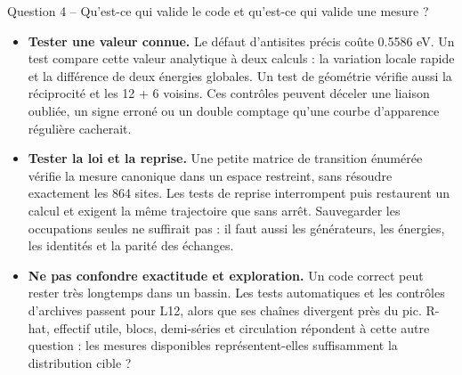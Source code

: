 \documentclass[10pt,a4paper]{article}
\begin{document}
\begin{oral}{Question 4 -- Qu'est-ce qui valide le code et qu'est-ce qui valide une mesure ?}
\begin{itemize}
\item \textbf{Tester une valeur connue.} Le défaut d'antisites précis
coûte 0.5586 eV. Un test compare cette valeur analytique à deux calculs :
la variation locale rapide et la différence de deux énergies globales.
Un test de géométrie vérifie aussi la réciprocité et les 12 + 6 voisins.
Ces contrôles peuvent déceler une liaison oubliée, un signe erroné ou
un double comptage qu'une courbe d'apparence régulière cacherait.
\item \textbf{Tester la loi et la reprise.} Une petite matrice de
transition énumérée vérifie la mesure canonique dans un espace restreint,
sans résoudre exactement les 864 sites. Les tests de reprise interrompent
puis restaurent un calcul et exigent la même trajectoire que sans arrêt.
Sauvegarder les occupations seules ne suffirait pas : il faut aussi les
générateurs, les énergies, les identités et la parité des échanges.
\item \textbf{Ne pas confondre exactitude et exploration.} Un code correct
peut rester très longtemps dans un bassin. Les tests automatiques et
les contrôles d'archives passent pour L12, alors que ses chaînes
divergent près du pic. R-hat, effectif utile, blocs, demi-séries et
circulation répondent à cette autre question : les mesures disponibles
représentent-elles suffisamment la distribution cible ?
\end{itemize}
\end{oral}
\end{document}
